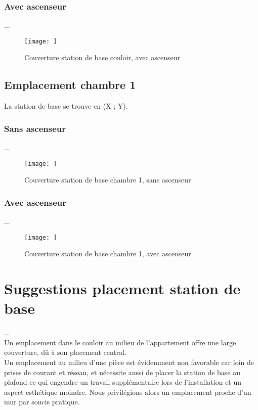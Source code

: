 \subsubsection{Avec ascenseur}
...
\begin{figure}[H]
    \centering
    \texttt{[image: ]}
    \caption{Couverture station de base couloir, avec ascenseur}
    \label{fig:simu-emplacement-couloir-avecasc}
\end{figure}


\subsection{Emplacement chambre 1}
La station de base se trouve en (X ; Y).

\subsubsection{Sans ascenseur}
...
\begin{figure}[H]
    \centering
    \texttt{[image: ]}
    \caption{Couverture station de base chambre 1, sans ascenseur}
    \label{fig:simu-emplacement-chambre1-sansasc}
\end{figure}
\subsubsection{Avec ascenseur}
...
\begin{figure}[H]
    \centering
    \texttt{[image: ]}
    \caption{Couverture station de base chambre 1, avec ascenseur}
    \label{fig:simu-emplacement-chambre1-avecasc}
\end{figure}


\section{Suggestions placement station de base}

...\\

Un emplacement dans le couloir au milieu de l'appartement offre une large couverture, dû à son placement central.\\

Un emplacement au milieu d'une pièce est évidemment non favorable car loin de prises de courant et réseau, et nécessite aussi de placer la station de base au plafond ce qui engendre un travail supplémentaire lors de l'installation et un aspect esthétique moindre. Nous privilégions alors un emplacement proche d'un mur par soucis pratique.\\

